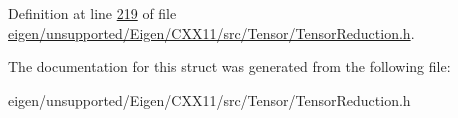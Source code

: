 Definition at line \hyperlink{eigen_2unsupported_2_eigen_2_c_x_x11_2src_2_tensor_2_tensor_reduction_8h_source_l00219}{219} of file \hyperlink{eigen_2unsupported_2_eigen_2_c_x_x11_2src_2_tensor_2_tensor_reduction_8h_source}{eigen/unsupported/\+Eigen/\+C\+X\+X11/src/\+Tensor/\+Tensor\+Reduction.\+h}.



The documentation for this struct was generated from the following file\+:\begin{DoxyCompactItemize}
\item 
eigen/unsupported/\+Eigen/\+C\+X\+X11/src/\+Tensor/\+Tensor\+Reduction.\+h\end{DoxyCompactItemize}
